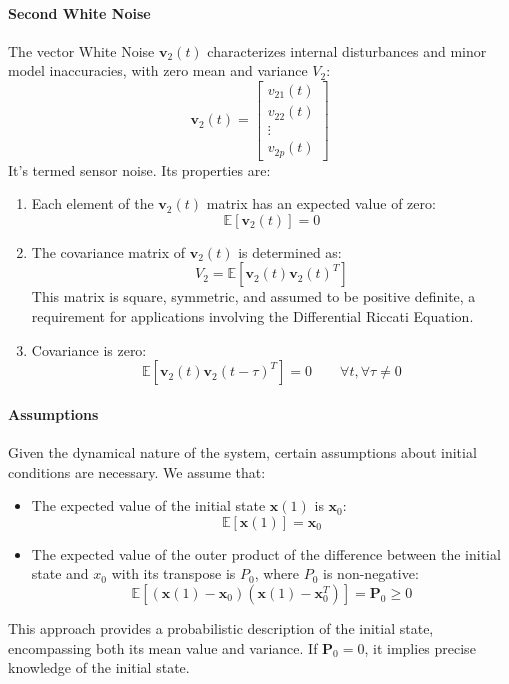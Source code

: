 \paragraph*{Second White Noise}
The vector White Noise $\mathbf{v}_2(t)$ characterizes internal disturbances and minor model inaccuracies, with zero mean and variance $V_2$:
\[\mathbf{v}_2(t)=\begin{bmatrix} v_{21}(t) \\ v_{22}(t) \\ \vdots \\ v_{2p}(t) \end{bmatrix}\]
It's termed sensor noise. 
Its properties are:
\begin{enumerate}
    \item Each element of the $\mathbf{v}_2(t)$ matrix has an expected value of zero:
        \[\mathbb{E}\left[\mathbf{v}_2(t)\right]=0\]
    \item The covariance matrix of $\mathbf{v}_2(t)$ is determined as:
        \[V_2=\mathbb{E}\left[\mathbf{v}_2(t)\mathbf{v}_2(t)^T\right]\]
        This matrix is square, symmetric, and assumed to be positive definite, a requirement for applications involving the Differential Riccati Equation.
    \item Covariance is zero:
        \[\mathbb{E}\left[\mathbf{v}_2(t)\mathbf{v}_2(t-\tau)^T\right]=0\qquad \forall t, \forall\tau\neq 0\]
\end{enumerate}

\paragraph*{Assumptions}
Given the dynamical nature of the system, certain assumptions about initial conditions are necessary. 
We assume that:
\begin{itemize}
    \item The expected value of the initial state $\mathbf{x}(1)$ is $\mathbf{x}_0$: 
        \[\mathbb{E}\left[\mathbf{x}(1)\right]=\mathbf{x}_0\]
    \item The expected value of the outer product of the difference between the initial state and $x_0$ with its transpose is $P_0$, where $P_0$ is non-negative: 
        \[\mathbb{E}\left[\left(\mathbf{x}(1)-\mathbf{x}_0\right)\left(\mathbf{x}(1)-\mathbf{x}_0^T\right)\right]=\mathbf{P}_0\geq 0\]
\end{itemize}
This approach provides a probabilistic description of the initial state, encompassing both its mean value and variance.
If $\mathbf{P}_0=0$, it implies precise knowledge of the initial state.

